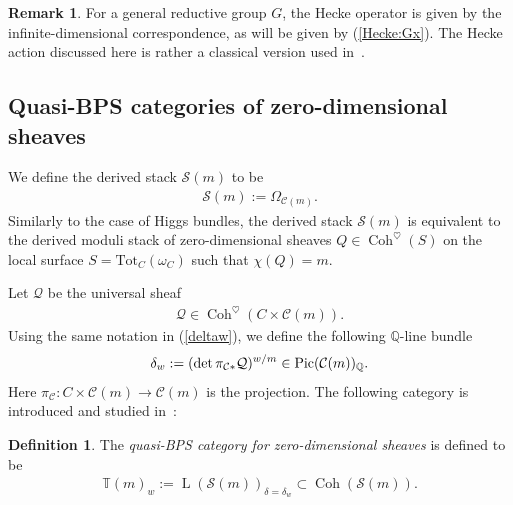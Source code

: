 \documentclass [11pt,oneside,a4paper,mathscr]{amsart}
\theoremstyle{definition}
\newtheorem{defn}[thm]{Definition}
\newtheorem{remark}[thm]{Remark}
\newcommand{\LL}{\operatorname{L}}
\newcommand{\Coh}{\operatorname{Coh}}
\begin{document}
\begin{remark}
For a general reductive group $G$, the Hecke operator is given by the 
infinite-dimensional correspondence, as will be given by (\ref{Hecke:Gx}). 
The Hecke action discussed here is rather a classical version used in~\cite[Section~1]{FGV}. 
\end{remark}

\subsection{Quasi-BPS categories of zero-dimensional 
sheaves}\label{subsec:qbps:zero}




We define the derived stack $\mathcal{S}(m)$ to be 
\begin{align*}
\mathcal{S}(m):=\Omega_{\mathcal{C}(m)}.    
\end{align*}
Similarly to the case of Higgs bundles, the derived stack $\mathcal{S}(m)$ is equivalent to the derived moduli stack of zero-dimensional sheaves $Q\in \Coh^{\heartsuit}(S)$ on the local surface 
$S=\mathrm{Tot}_C(\omega_C)$ such that $\chi(Q)=m$. 

Let $\mathcal{Q}$ be the universal sheaf 
\begin{align*}
    \mathcal{Q} \in \Coh^{\heartsuit}(C \times \mathcal{C}(m)). 
\end{align*}
Using the same notation in (\ref{deltaw}), we 
define the following $\mathbb{Q}$-line bundle 
\begin{align}\notag
    \delta_w:=(\det \pi_{\mathcal{C}\ast} \mathcal{Q})^{w/m} \in \mathrm{Pic}(\mathcal{C}(m))_{\mathbb{Q}}. 
\end{align}
Here $\pi_{\mathcal{C}} \colon C\times \mathcal{C}(m) \to \mathcal{C}(m)$ is the projection. 
The following category is introduced and studied in~\cite{P2, PT2}:
\begin{defn}
The \textit{quasi-BPS category for zero-dimensional sheaves} is defined to be
\begin{align*}
    \mathbb{T}(m)_w :=\LL(\mathcal{S}(m))_{\delta=\delta_w} 
    \subset \Coh(\mathcal{S}(m)). 
\end{align*}
\end{defn}
\end{document}
